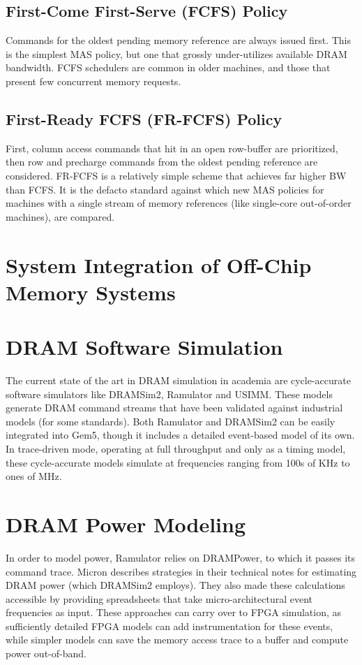 \subsection{First-Come First-Serve (FCFS) Policy}\label{fcfs}
Commands for the oldest pending memory reference are always issued first. This
is the simplest MAS policy, but one that grossly under-utilizes available DRAM
bandwidth. FCFS schedulers are common in older machines, and those that present
few concurrent memory requests.

\subsection{First-Ready FCFS (FR-FCFS)\cite{frfcfs} Policy}\label{frfcfs}
First, column access commands that hit in an open row-buffer are prioritized,
then row and precharge commands from the oldest pending reference are
considered.  FR-FCFS is a relatively simple scheme that achieves far higher BW
than FCFS. It is the defacto standard against which new MAS policies for
machines with a single stream of memory references (like single-core
out-of-order machines), are compared.

\section{System Integration of Off-Chip Memory Systems}


\section{DRAM Software Simulation}

The current state of the art in DRAM simulation in academia are cycle-accurate
software simulators like DRAMSim2\cite{dramsim}, Ramulator\cite{ramulator} and
USIMM\cite{usimm}. These models generate DRAM command streams that have been
validated against industrial models (for some standards). Both Ramulator and
DRAMSim2 can be easily integrated into Gem5\cite{gem5}, though it includes a
detailed event-based model of its own\cite{gem5event}. In trace-driven mode,
operating at full throughput and only as a timing model, these cycle-accurate
models simulate at frequencies ranging from 100s of KHz to ones of
MHz\cite{ramulator}.

\section{DRAM Power Modeling}

In order to model power, Ramulator relies on DRAMPower\cite{drampower}, to
which it passes its command trace. Micron describes strategies in their
technical notes for estimating DRAM power\cite{micronpower} (which DRAMSim2
employs). They also made these calculations accessible by providing
spreadsheets that take micro-architectural event frequencies as input. These
approaches can carry over to FPGA simulation, as sufficiently detailed FPGA
models can add instrumentation for these events, while simpler models can save
the memory access trace to a buffer and compute power
out-of-band\cite{strober}.
